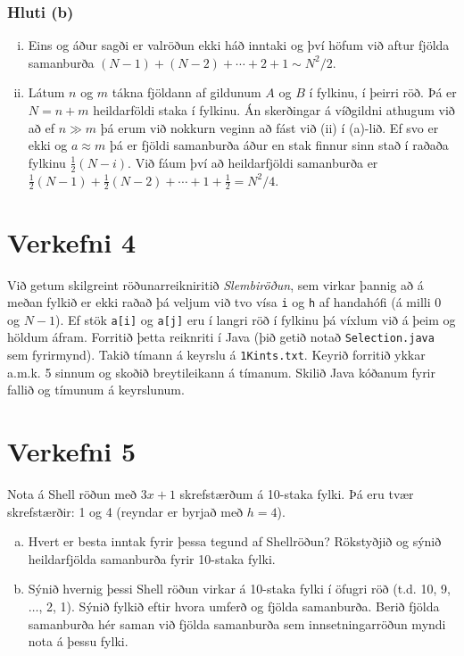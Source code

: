\documentclass[12pt, a4paper, hidelinks]{article}
\begin{document}
\subsubsection*{Hluti (b)}
    \begin{enumerate}[(i)]
       \item Eins og áður sagði er valröðun ekki háð inntaki og því höfum við aftur fjölda samanburða $(N - 1) + (N - 2) + \cdots + 2 + 1 \sim N^2/2$.
       \item Látum $n$ og $m$ tákna fjöldann af gildunum $A$ og $B$ í fylkinu, í þeirri röð. Þá er $N = n + m$ heildarföldi staka í fylkinu. Án skerðingar á
       víðgildni athugum við að ef $n \gg m$ þá erum við nokkurn veginn að fást við (ii) í (a)-lið. Ef svo er ekki og $a \approx m$ þá er fjöldi samanburða áður
       en stak finnur sinn stað í raðaða fylkinu $\frac 12 (N - i)$. Við fáum því að heildarfjöldi samanburða er $\frac 12 (N - 1) + \frac 12 (N - 2) + \cdots + 1 + \frac 12 = N^2/4$.
    \end{enumerate}

\newpage

\section*{Verkefni 4}
Við getum skilgreint röðunarreikniritið \emph{Slembiröðun}, sem virkar þannig að á meðan fylkið
er ekki raðað þá veljum við tvo vísa \texttt{i} og \texttt{h} af handahófi (á milli $0$ og $N - 1$). Ef
stök \texttt{a[i]} og \texttt{a[j]} eru í langri röð í fylkinu þá víxlum við á þeim og höldum áfram. Forritið
þetta reiknriti í Java (þið getið notað \texttt{Selection.java} sem fyrirmynd). Takið tímann á keyrslu á \texttt{1Kints.txt}.
Keyrið forritið ykkar a.m.k. 5 sinnum og skoðið breytileikann á tímanum. Skilið Java kóðanum fyrir fallið og tímunum á keyrslunum.

\newpage

\section*{Verkefni 5}
Nota á Shell röðun með $3x + 1$ skrefstærðum á 10-staka fylki. Þá eru tvær skrefstærðir: 1 og 4 (reyndar er byrjað með $h = 4$).
\begin{enumerate}[(a)]
    \item Hvert er besta inntak fyrir þessa tegund af Shellröðun? Rökstyðjið og sýnið heildarfjölda
    samanburða fyrir 10-staka fylki.
    \item Sýnið hvernig þessi Shell röðun virkar á 10-staka fylki í öfugri röð (t.d. 10, 9, $\ldots$\@ , 2, 1).
    Sýnið fylkið eftir hvora umferð og fjölda samanburða. Berið fjölda samanburða hér saman við fjölda samanburða
    sem innsetningarröðun myndi nota á þessu fylki.
\end{enumerate}
\end{document}
